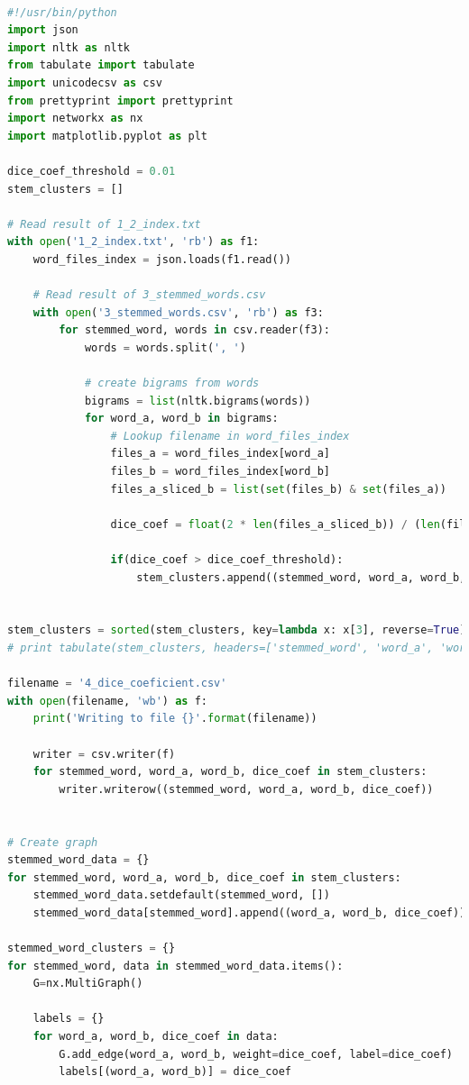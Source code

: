 \documentclass[letterpaper,11pt]{article}
\begin{document}
\begin{lstlisting}[language=python, caption={Creating Cluster using Dice's Coefficient}, label={lst:cluster}]

#!/usr/bin/python
import json
import nltk as nltk
from tabulate import tabulate
import unicodecsv as csv
from prettyprint import prettyprint
import networkx as nx
import matplotlib.pyplot as plt

dice_coef_threshold = 0.01
stem_clusters = []

# Read result of 1_2_index.txt
with open('1_2_index.txt', 'rb') as f1:
    word_files_index = json.loads(f1.read())

    # Read result of 3_stemmed_words.csv
    with open('3_stemmed_words.csv', 'rb') as f3:
        for stemmed_word, words in csv.reader(f3):
            words = words.split(', ')

            # create bigrams from words
            bigrams = list(nltk.bigrams(words))
            for word_a, word_b in bigrams:
                # Lookup filename in word_files_index
                files_a = word_files_index[word_a]
                files_b = word_files_index[word_b]
                files_a_sliced_b = list(set(files_b) & set(files_a))

                dice_coef = float(2 * len(files_a_sliced_b)) / (len(files_a) + len(files_b))

                if(dice_coef > dice_coef_threshold):
                    stem_clusters.append((stemmed_word, word_a, word_b, dice_coef))


stem_clusters = sorted(stem_clusters, key=lambda x: x[3], reverse=True)
# print tabulate(stem_clusters, headers=['stemmed_word', 'word_a', 'word_b', 'dice_coef'])

filename = '4_dice_coeficient.csv'
with open(filename, 'wb') as f:
    print('Writing to file {}'.format(filename))

    writer = csv.writer(f)
    for stemmed_word, word_a, word_b, dice_coef in stem_clusters:
        writer.writerow((stemmed_word, word_a, word_b, dice_coef))


# Create graph
stemmed_word_data = {}
for stemmed_word, word_a, word_b, dice_coef in stem_clusters:
    stemmed_word_data.setdefault(stemmed_word, [])
    stemmed_word_data[stemmed_word].append((word_a, word_b, dice_coef))

stemmed_word_clusters = {}
for stemmed_word, data in stemmed_word_data.items():
    G=nx.MultiGraph()

    labels = {}
    for word_a, word_b, dice_coef in data:
        G.add_edge(word_a, word_b, weight=dice_coef, label=dice_coef)
        labels[(word_a, word_b)] = dice_coef


\end{lstlisting}
\end{document}
